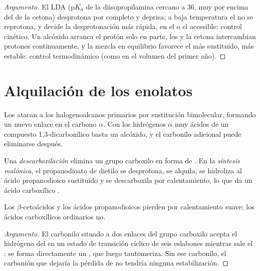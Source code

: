 \begin{proof}[Argumento]
El LDA ($\mathrm pK_a$ de la diisopropilamina cercano a 36, muy por encima del de la cetona) desprotona por completo y
deprisa; a baja temperatura el  no se reprotona, y decide la desprotonación más rápida, en el
 o el  accesible: control cinético. Un alcóxido arranca el protón solo en parte,
los  y la cetona intercambian protones continuamente, y la mezcla en equilibrio favorece el
 más sustituido, más estable: control termodinámico (como en el volumen del primer año).
\end{proof}

\section{Alquilación de los enolatos}

Los  atacan a los halogenoalcanos primarios por sustitución bimolecular, formando un nuevo enlace  en
el carbono $\alpha$. Con los hidrógenos $\alpha$ muy ácidos de un compuesto 1,3-dicarbonílico basta un alcóxido,
y el carbonilo adicional puede eliminarse después.

\begin{definition}[Descarboxilación]\label{def:b2:enolates-aldol:decarboxylation}
Una \emph{descarboxilación} elimina un grupo carboxilo en forma de . En la
\emph{síntesis malónica}, el propanodioato de dietilo se desprotona,
se alquila, se hidroliza al ácido propanodioico sustituido y se descarboxila por calentamiento, lo que da un
ácido carboxílico .
\end{definition}

\begin{proposition}\label{prop:b2:enolates-aldol:decarboxylation}
Los $\beta$-cetoácidos y los ácidos propanodioicos pierden  por calentamiento suave; los ácidos carboxílicos ordinarios
no.
\end{proposition}

\begin{proof}[Argumento]
El carbonilo situado a dos enlaces del grupo carboxilo acepta el hidrógeno del  en un estado de transición
cíclico de seis eslabones mientras sale el : se forma directamente un , que luego tautomeriza. Sin
ese carbonilo, el carbanión que dejaría la pérdida de  no tendría ninguna estabilización.
\end{proof}

